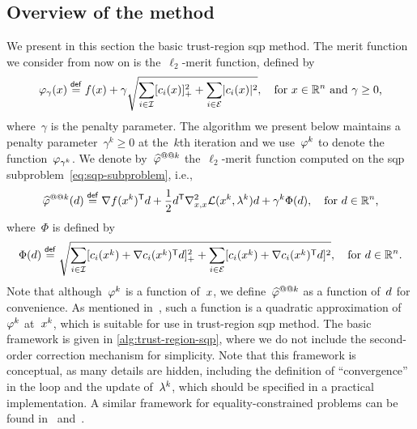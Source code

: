 \subsection{Overview of the method}

We present in this section the basic trust-region \gls{sqp} method.
The merit function we consider from now on is the~$\ell_2$-merit function, defined by
\begin{equation*}
    \merit_{\gamma}(\iter) \eqdef \obj(\iter) + \gamma \sqrt{\sum_{i \in \iub} \posp{\con{i}(\iter)}^2 + \sum_{i \in \ieq} \abs{\con{i}(\iter)}^2}, \quad \text{for~$\iter \in \R^n$ and~$\gamma \ge 0$,}
\end{equation*}
where~$\gamma$ is the penalty parameter.
The algorithm we present below maintains a penalty parameter~$\gamma^k \ge 0$ at the~$k$th iteration and we use~$\merit[k]$ to denote the function~$\merit_{\gamma^k}$.
We denote by~$\meritm[k]$ the~$\ell_2$-merit function computed on the \gls{sqp} subproblem~\cref{eq:sqp-subproblem}, i.e.,
\begin{equation*}
    \meritm[k](\step) \eqdef \nabla \obj(\iter[k])^{\T} \step + \frac{1}{2} \step^{\T} \nabla_{x, x}^2 \lag(\iter[k], \lm[k]) \step + \gamma^k \Phi(\step), \quad \text{for~$\step \in \R^n$,}
\end{equation*}
where~$\Phi$ is defined by
\begin{equation*}
    \Phi(\step) \eqdef \sqrt{\sum_{i \in \iub} \posp{\con{i}(\iter[k]) + \nabla \con{i}(\iter[k])^{\T} \step}^2 + \sum_{i \in \ieq} [\con{i}(\iter[k]) + \nabla \con{i}(\iter[k])^{\T} \step]^2}, \quad \text{for~$\step \in \R^n$.}
\end{equation*}
Note that although~$\merit[k]$ is a function of~$\iter$, we define~$\meritm[k]$ as a function of~$\step$ for convenience.
As mentioned in~\cite[\S~15.3.2.1]{Conn_Gould_Toint_2000}, such a function is a quadratic approximation of~$\merit[k]$ at~$\iter[k]$, which is suitable for use in trust-region \gls{sqp} method.
The basic framework is given in \cref{alg:trust-region-sqp}, where we do not include the second-order correction mechanism for simplicity.
Note that this framework is conceptual, as many details are hidden, including the definition of \enquote{convergence} in the loop and the update of~$\lm[k]$, which should be specified in a practical implementation.
A similar framework for equality-constrained problems can be found in~\cite[\S~2]{Powell_Yuan_1991} and~\cite[Alg.~18.4]{Nocedal_Wright_2006}.

